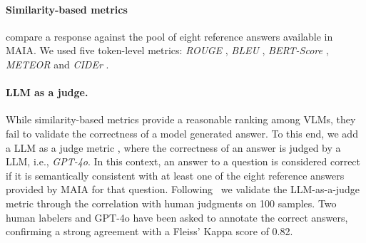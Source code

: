  
\paragraph{Similarity-based metrics}  compare a  response against the pool of eight reference answers available in MAIA.
We used five token-level metrics: \textit{ROUGE} \cite{lin-2004-rouge}, \textit{BLEU} \cite{10.3115/1073083.1073135}, \textit{BERT-Score} \cite{zhang2020bertscoreevaluatingtextgeneration}, \textit{METEOR} \cite{10.5555/1626355.1626389} and \textit{CIDEr} \cite{vedantam2015ciderconsensusbasedimagedescription}. 


\paragraph{LLM as a judge.} While similarity-based metrics  provide a reasonable ranking among VLMs, they fail to validate the correctness of a model generated answer.  To this end, we add a LLM as a judge metric \cite{gu2025surveyllmasajudge}, where the correctness of an answer is judged by a LLM, i.e., \textit{GPT-4o}.
In this context,  an answer to a question is considered correct if it is semantically consistent with at least one of the eight reference answers provided by MAIA for that question. Following~\citet{bavaresco:llm24}  we validate the LLM-as-a-judge metric through the correlation with human judgments on 100 samples. Two human labelers and GPT-4o have been asked to annotate the correct answers, confirming a strong agreement with a Fleiss' Kappa score of 0.82.



